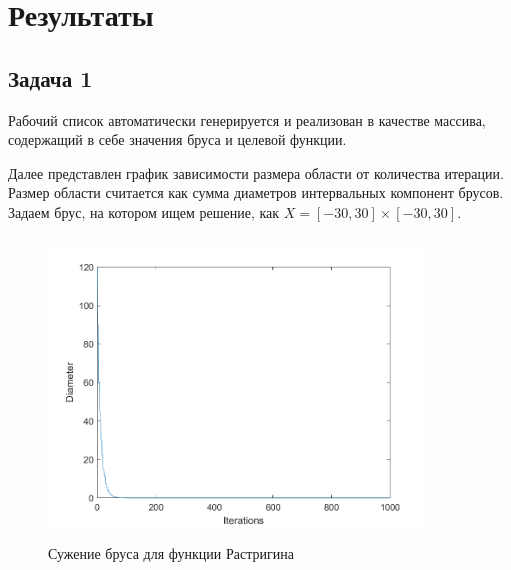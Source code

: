 \documentclass[12pt,a4paper]{scrartcl}
\begin{document}
\section {Результаты}

\subsection{Задача 1}
Рабочий список автоматически генерируется и реализован в качестве массива, содержащий в себе значения бруса и целевой функции.

Далее представлен график зависимости размера области от количества итерации. Размер области считается как сумма диаметров интервальных компонент брусов. \\
Задаем брус, на котором ищем решение, как
$X = [-30, 30] \times [-30, 30]$. \\
\begin{figure}[H]
    \centering
    \includegraphics[width=10cm, height=8cm]{fig/rosenbrock.png}
    \caption{Сужение бруса для функции Растригина}
    \label{fig:rast}
\end{figure}
 
\end{document}
